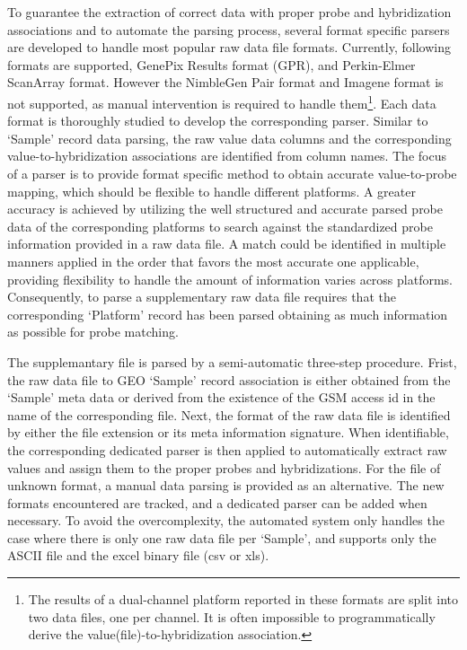 To guarantee the extraction of correct data with proper probe and
hybridization associations and to automate the parsing process, several format
specific parsers are developed to handle most popular raw data file formats.
%
Currently, following formats are supported, GenePix Results format (GPR),
and Perkin-Elmer ScanArray format.  
However the NimbleGen Pair format and Imagene format is not supported, as
manual intervention is required to handle them\footnote{The results of a
  dual-channel platform reported in these formats are split into two data
  files, one per channel.  It is often impossible to programmatically derive
  the value(file)-to-hybridization association.}.
%
Each data format is thoroughly studied to develop the corresponding parser.
%
Similar to `Sample' record data parsing, the raw value data columns and the
corresponding value-to-hybridization associations are identified from column
names.
%
The focus of a parser is to provide format specific method to obtain accurate
value-to-probe mapping, which should be flexible to handle different platforms.
%
A greater accuracy is achieved by utilizing the well structured and accurate
parsed probe data of the corresponding platforms to search against the
standardized probe information provided in a raw data file.
%
A match could be identified in multiple manners applied in the order that
favors the most accurate one applicable, providing flexibility to handle the
amount of information varies across platforms.
%
Consequently, to parse a supplementary raw data file requires that the
corresponding `Platform' record has been parsed obtaining as much information
as possible for probe matching.


The supplemantary file is parsed by a semi-automatic three-step procedure.
%
Frist, the raw data file to GEO `Sample' record association is either obtained
from the `Sample' meta data or derived from the existence of the GSM access id
in the name of the corresponding file.
%
Next, the format of the raw data file is identified by either the file
extension or its meta information signature.
%
When identifiable, the corresponding dedicated parser is then applied to
automatically extract raw values and assign them to the proper probes and
hybridizations.
%
For the file of unknown format, a manual data parsing is provided as an
alternative.
%
The new formats encountered are tracked, and a dedicated parser can be added
when necessary.
%
%
To avoid the overcomplexity, the automated system only handles the case
where there is only one raw data file per `Sample', and supports only the
ASCII file and the excel binary file (csv or xls).

